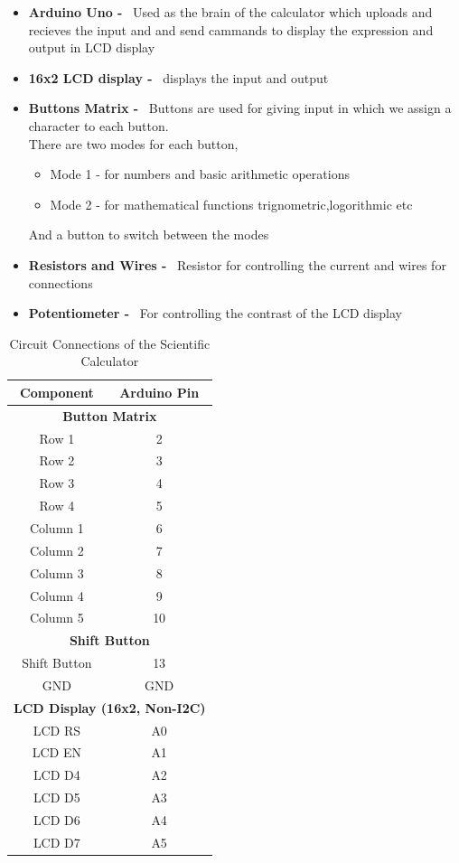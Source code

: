\documentclass[a4paper,12pt]{article}
\begin{document}
\begin{itemize}
    \item \textbf{Arduino Uno -} \ Used as the brain of the calculator which uploads and recieves the input and and send cammands to display the expression and output in LCD display
    \item \textbf{16x2 LCD display -} \ displays the input and output 
    \item \textbf{Buttons Matrix -} \ Buttons are used for giving input in which we assign a character to each button. \\
    There are two modes for each button,
    \begin{itemize}
        \item Mode 1 - for numbers and basic arithmetic operations
        \item Mode 2 - for mathematical functions trignometric,logorithmic etc
    \end{itemize}
    And a button to switch between the modes
    \item \textbf{Resistors and Wires -} \ Resistor for controlling the current and wires for connections
    \item \textbf{Potentiometer -} \ For controlling the contrast of the LCD display
\end{itemize}
\begin{table}[H]
    \centering
    \renewcommand{\arraystretch}{1.2} %
    \begin{tabular}{|c|c|}
        \hline
        \textbf{Component} & \textbf{Arduino Pin} \\
        \hline
        \multicolumn{2}{|c|}{\textbf{Button Matrix}} \\
        \hline
        Row 1 & 2 \\
        Row 2 & 3 \\
        Row 3 & 4 \\
        Row 4 & 5 \\
        Column 1 & 6 \\
        Column 2 & 7 \\
        Column 3 & 8 \\
        Column 4 & 9 \\
        Column 5 & 10 \\
        \hline
        \multicolumn{2}{|c|}{\textbf{Shift Button}} \\
        \hline
        Shift Button & 13 \\
        GND & GND \\
        \hline
        \multicolumn{2}{|c|}{\textbf{LCD Display (16x2, Non-I2C)}} \\
        \hline
        LCD RS & A0 \\
        LCD EN & A1 \\
        LCD D4 & A2 \\
        LCD D5 & A3 \\        
        LCD D6 & A4 \\
        LCD D7 & A5 \\
        \hline
    \end{tabular}
    \caption{Circuit Connections of the Scientific Calculator}
    \label{tab:circuit_connections}
\end{table}
\newpage
\end{document}
